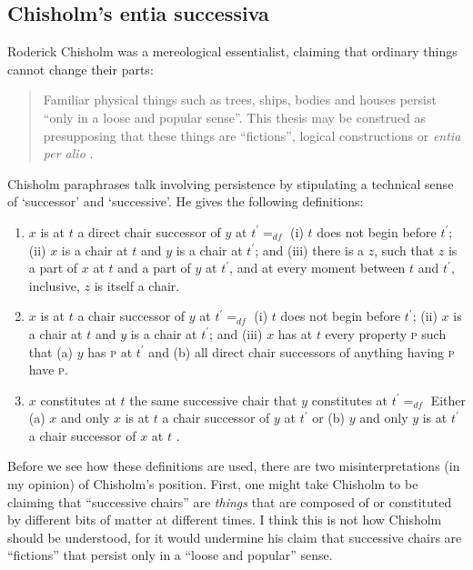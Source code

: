 \documentclass[12pt,twoside]{reedfancy}
\begin{document}
\begin{spacing}{1.25}
\subsection{Chisholm's entia successiva}
\label{chisholm}
Roderick Chisholm was a mereological essentialist, claiming that
ordinary things cannot change their parts:

\begin{quote}
Familiar physical things such as trees, ships, bodies and houses
persist ``only in a loose and popular sense''.  This thesis may be
construed as presupposing that these things are ``fictions'', logical
constructions or {\em entia per alio} \citeyearpar[97]{chisholm1979}.
\end{quote}

Chisholm paraphrases talk involving persistence by stipulating a
technical sense of `successor' and `successive'.  He gives the
following definitions:

\begin{enumerate}[ref=\arabic*]
  \item $x$ is at $t$ a direct chair successor of $y$ at $t^{\prime}
    =_{df}$ (i) $t$ does not begin before $t^{\prime}$; (ii) $x$ is a
    chair at $t$ and $y$ is a chair at $t^{\prime}$; and (iii) there
    is a $z$, such that $z$ is a part of $x$ at $t$ and a part of $y$
    at $t^{\prime}$, and at every moment between $t$ and $t^{\prime}$,
    inclusive, $z$ is itself a chair. \label{suc1}
  \item $x$ is at $t$ a chair successor of $y$ at $t^{\prime} =_{df}$
    (i) $t$ does not begin before $t^{\prime}$; (ii) $x$ is a chair at
    $t$ and $y$ is a chair at $t^{\prime}$; and (iii) $x$ has at $t$
    every property \textsc{p} such that (a) $y$ has \textsc{p} at
    $t^{\prime}$ and (b) all direct chair successors of anything
    having \textsc{p} have \textsc{p}. \label{suc2}
  \item $x$ constitutes at $t$ the same successive chair that $y$
    constitutes at $t^{\prime} =_{df}$ Either (a) $x$ and only $x$ is
    at $t$ a chair successor of $y$ at $t^{\prime}$ or (b) $y$ and
    only $y$ is at $t^{\prime}$ a chair successor of $x$ at $t$
    \citep[99--100]{chisholm1979}. \label{suc3}
\end{enumerate}

Before we see how these definitions are used, there are two
misinterpretations (in my opinion) of Chisholm's position.  First, one
might take Chisholm to be claiming that ``successive chairs'' are {\em
  things} that are composed of or constituted by different bits of
matter at different times.  I think this is not how Chisholm should be
understood, for it would undermine his claim that successive chairs
are ``fictions'' that persist only in a ``loose and popular'' sense.


\end{spacing}
\end{document}
